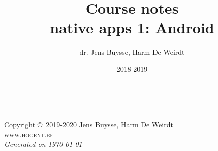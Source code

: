 \documentclass[11pt,fleqn,a4paper]{book}
\author{dr. Jens Buysse, Harm De Weirdt}
\title{Course notes \\ native apps 1: Android}
\date{2018-2019}
\begin{document}
\thetitlepage


\newpage
~\vfill
\thispagestyle{empty}

\noindent Copyright \copyright\ 2019-2020 Jens Buysse, Harm De Weirdt\\ %

\noindent \textsc{www.hogent.be}\\ %

\noindent \textit{Generated on \today} %



\tableofcontents %

\printglossary[type=\acronymtype]

\cleardoublepage %

\setlength{\parindent}{0pt}










\printbibliography
\printindex
\end{document}
